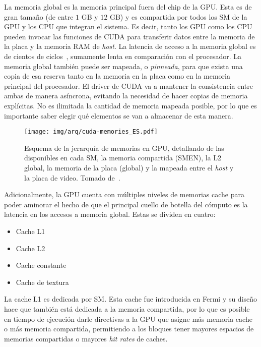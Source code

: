 La memoria global es la memoria principal fuera del chip de la GPU.
Esta es de gran tama\~no (de entre $1$ GB y $12$ GB) y es compartida por todos los SM de la GPU y los CPU que integran el sistema.
Es decir, tanto los GPU como los CPU pueden invocar las funciones de CUDA para transferir datos entre la memoria de la placa y la memoria RAM de \textit{host}.
La latencia de acceso a la memoria global es de cientos de ciclos~\cite{Demystifying}, sumamente lenta en comparaci\'on con el procesador.
La memoria global tambi\'en puede ser mapeada, o \textit{pinneada}, para que exista una copia de esa reserva tanto en la memoria en la placa como en la memoria principal del procesador. El driver de CUDA va a mantener la consistencia entre ambas de manera as\'incrona, evitando la necesidad de hacer copias de memoria expl\'icitas.
No es ilimitada la cantidad de memoria mapeada posible, por lo que es importante saber elegir qu\'e elementos se van a almacenar de esta manera.

\begin{figure}[htbp]
    \centering
    \texttt{[image: img/arq/cuda-memories\_ES.pdf]}
    \caption{Esquema de la jerarqu\'ia de memorias en GPU, detallando de las disponibles en cada SM, la memoria compartida (SMEN), la L2 global, la
    memoria de la placa (global) y la mapeada entre el \textit{host} y la placa de video. Tomado de~\cite{farberCuda}.}
    \label{fig:cuda-memories}
\end{figure}

Adicionalmente, la GPU cuenta con m\'ultiples niveles de memorias cache para poder aminorar el hecho de que el principal cuello de botella del c\'omputo es la latencia en los accesos a memoria global.
Estas se dividen en cuatro:

\begin{itemize}
  \item Cache L1
  \item Cache L2
  \item Cache constante
  \item Cache de textura
\end{itemize}

La cache L1 es dedicada por SM.
Esta cache fue introducida en Fermi y su dise\~no hace que tambi\'en est\'a dedicada a la memoria compartida, por lo que es posible en tiempo de ejecuci\'on darle directivas a la GPU que asigne m\'as memoria cache o m\'as memoria compartida, permitiendo a los bloques tener mayores espacios de memorias compartidas o mayores \textit{hit rates} de caches.

